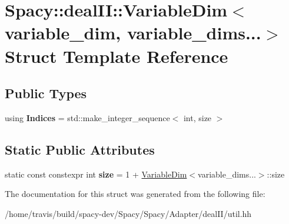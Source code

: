 \hypertarget{structSpacy_1_1dealII_1_1VariableDim_3_01variable__dim_00_01variable__dims_8_8_8_4}{\section{Spacy\-:\-:deal\-I\-I\-:\-:Variable\-Dim$<$ variable\-\_\-dim, variable\-\_\-dims...$>$ Struct Template Reference}
\label{structSpacy_1_1dealII_1_1VariableDim_3_01variable__dim_00_01variable__dims_8_8_8_4}
}
\subsection*{Public Types}
\begin{DoxyCompactItemize}
\item 
\hypertarget{structSpacy_1_1dealII_1_1VariableDim_3_01variable__dim_00_01variable__dims_8_8_8_4_a56df7ae96d0a75205a92635516e41256}{using {\bfseries Indices} = std\-::make\-\_\-integer\-\_\-sequence$<$ int, size $>$}\label{structSpacy_1_1dealII_1_1VariableDim_3_01variable__dim_00_01variable__dims_8_8_8_4_a56df7ae96d0a75205a92635516e41256}

\end{DoxyCompactItemize}
\subsection*{Static Public Attributes}
\begin{DoxyCompactItemize}
\item 
\hypertarget{structSpacy_1_1dealII_1_1VariableDim_3_01variable__dim_00_01variable__dims_8_8_8_4_aebc4163ada748495cef9301d701bb0d4}{static const constexpr int {\bfseries size} = 1 + \hyperlink{structSpacy_1_1dealII_1_1VariableDim}{Variable\-Dim}$<$variable\-\_\-dims...$>$\-::size}\label{structSpacy_1_1dealII_1_1VariableDim_3_01variable__dim_00_01variable__dims_8_8_8_4_aebc4163ada748495cef9301d701bb0d4}

\end{DoxyCompactItemize}


The documentation for this struct was generated from the following file\-:\begin{DoxyCompactItemize}
\item 
/home/travis/build/spacy-\/dev/\-Spacy/\-Spacy/\-Adapter/deal\-I\-I/util.\-hh\end{DoxyCompactItemize}
